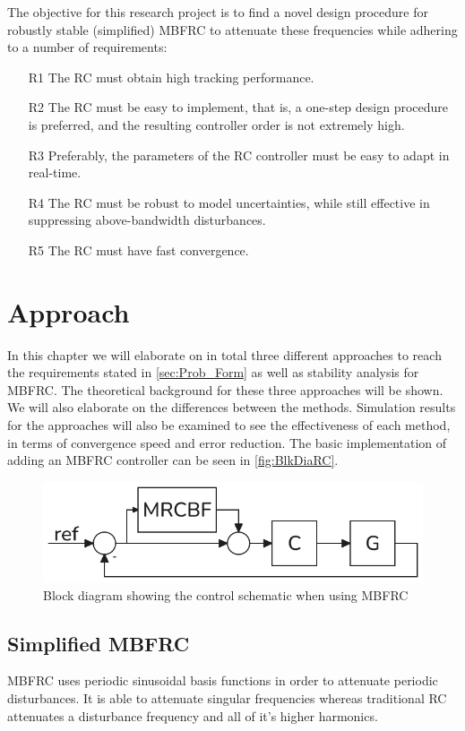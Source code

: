 \documentclass[journal]{IEEEtran}
\begin{document}
The objective for this research project is to find a novel design procedure for robustly stable (simplified) MBFRC to attenuate these frequencies while adhering to a number of requirements:
\begin{enumerate}
    \item[R1] The RC must obtain high tracking performance.
    \item[R2] The RC must be easy to implement, that is, a one-step design procedure is preferred, and the resulting controller order is not extremely high.
    \item[R3] Preferably, the parameters of the RC controller must be easy to adapt in real-time.
    \item[R4] The RC must be robust to model uncertainties, while still effective in suppressing above-bandwidth disturbances.
    \item[R5] The RC must have fast convergence.
\end{enumerate}



\section{Approach}
\label{sec:Approach}
In this chapter we will elaborate on in total three different approaches to reach the requirements stated in \autoref{sec:Prob_Form} as well as stability analysis for MBFRC. The theoretical background for these three approaches will be shown. We will also elaborate on the differences between the methods. Simulation results for the approaches will also be examined to see the effectiveness of each method, in terms of convergence speed and error reduction. The basic implementation of adding an MBFRC controller can be seen in \autoref{fig:BlkDiaRC}.

\begin{figure}[!t]
    \centering
    \includegraphics[width=0.8\linewidth]{figures/simple_MBFRC/MBFRC_schematic.png}
    \caption{Block diagram showing the control schematic when using MBFRC}
    \label{fig:BlkDiaRC}
\end{figure}
\subsection{Simplified MBFRC}\label{ssec: SimplifiedMBFRC}
MBFRC uses periodic sinusoidal basis functions in order to attenuate periodic disturbances. It is able to attenuate singular frequencies whereas traditional RC attenuates a disturbance frequency and all of it's higher harmonics. 
\end{document}
